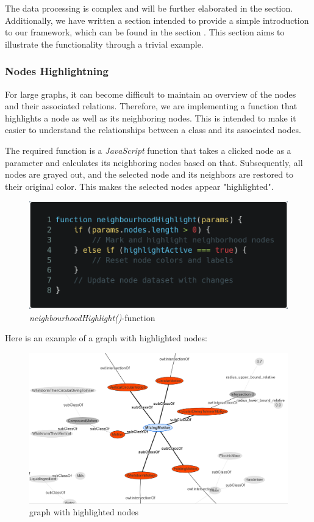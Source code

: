 The data processing is complex and will be further elaborated in the  section. 
Additionally, we have written a section intended to provide a simple introduction to our framework, which can be found in the section 
 . This section aims to illustrate the functionality through a trivial example.
\subsubsection*{Nodes Highlightning}

For large graphs, it can become difficult to maintain an overview of the nodes and their associated relations. 
Therefore, we are implementing a function that highlights a node as well as its neighboring nodes. 
This is intended to make it easier to understand the relationships between a class and its associated nodes. 

The required function is a \textit{JavaScript} function that takes a clicked node as a parameter and calculates its neighboring nodes based on that. 
Subsequently, all nodes are grayed out, and the selected node and its neighbors are restored to their original color. This makes the selected nodes appear "highlighted".

\begin{figure}[H]
    \includegraphics[scale=0.25]{Graphics/neighbourhood_highlighting.png}
    \caption{\textit{neighbourhoodHighlight()}-function}
\end{figure}

Here is an example of a graph with highlighted nodes:

\begin{figure}[H]
    \includegraphics[scale=0.3]{Graphics/nodes_highlight_html.png}
    \caption{graph with highlighted nodes}
\end{figure}

